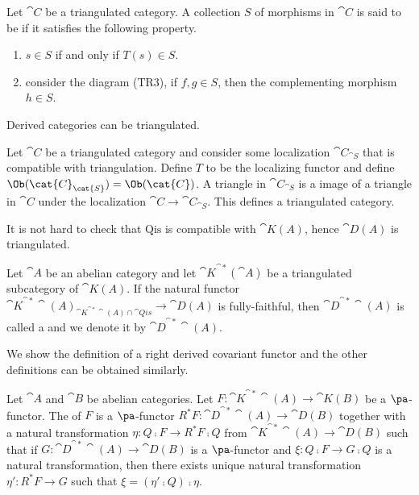 \begin{definition}
    Let $\cat{C}$ be a triangulated category. A collection $S$ of morphisms in $\cat{C}$ is said to be  if it satisfies the following property.
    \begin{enumerate}
        \item $s\in S$ if and only if $T(s)\in S$.
        \item consider the diagram (TR3), if $f,g\in S$, then the complementing morphism $h\in S$.
    \end{enumerate}
\end{definition}
\par
Derived categories can be triangulated. 
\begin{proposition}
    Let $\cat{C}$ be a triangulated category and consider some localization ${\cat{C}}_{\cat{S}}$ that is compatible with triangulation. Define $T$ to be the localizing functor and define $\Ob({\cat{C}}_{\cat{S}})=\Ob(\cat{C})$. A triangle in ${\cat{C}}_{\cat{S}}$ is a image of a triangle in $\cat{C}$ under the localization $\cat{C}\to{\cat{C}}_{\cat{S}}$. This defines a triangulated category.
\end{proposition}
\par
It is not hard to check that $\text{Qis}$ is compatible with $\cat{K(A)}$, hence $\cat{D(A)}$ is triangulated.
\begin{definition}
    Let $\cat{A}$ be an abelian category and let ${\cat{K}}^{\cat{*}}(\cat{A})$ be a triangulated subcategory of $\cat{K(A)}$. If the natural functor ${{\cat{K}}^{\cat{*}}\cat{(A)}}_{{\cat{K}}^{\cat{*}}\cat{(A)}\cap\cat{Qis}}\to\cat{D(A)}$ is fully-faithful, then ${\cat{D}}^{\cat{*}}\cat{(A)}$ is called a  and we denote it by ${\cat{D}}^{\cat{*}}\cat{(A)}$. 
\end{definition}
\par
We show the definition of a right derived covariant functor and the other definitions can be obtained similarly.
\begin{definition}
    Let $\cat{A}$ and $\cat{B}$ be abelian categories. Let $F:{\cat{K}}^{\cat{*}}\cat{(A)}\to\cat{K(B)}$ be a $\pa$-functor. The  of $F$ is a $\pa$-functor ${R}^{*}F:{\cat{D}}^{\cat{*}}\cat{(A)}\to\cat{D(B)}$ together with a natural transformation $\eta:Q\comp F\to{R}^{*}F\comp Q$ from ${\cat{K}}^{\cat{*}}\cat{(A)}\to\cat{D(B)}$ such that if $G:{\cat{D}}^{\cat{*}}\cat{(A)}\to\cat{D(B)}$ is a $\pa$-functor and $\xi:Q\comp F\to G\comp Q$ is a natural transformation, then there exists unique natural transformation $\eta':{R}^{*}F\to G$ such that $\xi=(\eta'\comp Q)\comp\eta$.
\end{definition}
